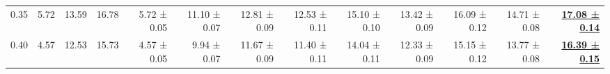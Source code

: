 \documentclass[a4paper,10pt,conference,onecolumn]{IEEEtran}
\begin{document}
\begin{table*}[b]
{\begin{tabular}{@{}crrrrrrrrrrrr@{}}
			0.35        & 5.72                                       & 13.59                                                                    & 16.78                                 & 5.72 ± 0.05                   & 11.10 ± 0.07                          & 12.81 ± 0.09                          & 12.53 ± 0.11                          & 15.10 ± 0.10                          & 13.42 ± 0.09                          & 16.09 ± 0.12                          & 14.71 ± 0.08                          & \underline{\textbf{17.08 ± 0.14}}     \\
			0.40        & 4.57                                       & 12.53                                                                    & 15.73                                 & 4.57 ± 0.05                   & 9.94 ± 0.07                           & 11.67 ± 0.09                          & 11.40 ± 0.11                          & 14.04 ± 0.11                          & 12.33 ± 0.09                          & 15.15 ± 0.12                          & 13.77 ± 0.08                          & \underline{\textbf{16.39 ± 0.15}}     \\
			\bottomrule
		\end{tabular}
	}
\end{table*}
\end{document}
